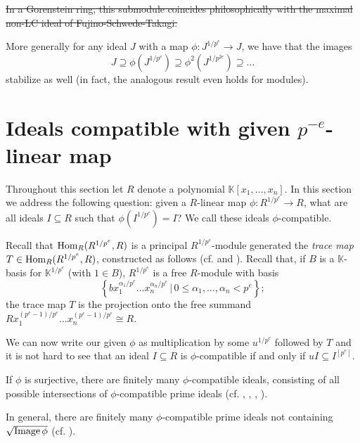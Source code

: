 \documentclass[11pt]{amsart}
\begin{document}
\bigskip\sout{In a Gorenstein ring, this submodule coincides philosophically with the maximal non-LC ideal of Fujino-Schwede-Takagi.}

More generally for any ideal $J$ with a map $\phi : J^{1/p^e} \to J$, we have that the images
\[
J \supseteq \phi(J^{1/p^e}) \supseteq \phi^2(J^{1/p^{2e}}) \supseteq \dots
\]
stabilize as well (in fact, the analogous result even holds for modules).


\section{Ideals compatible with given $p^{-e}$-linear map}\label{Section: compatible ideals}

Throughout this section let $R$ denote a polynomial $\mathbb{K}[x_1, \dots, x_n]$. In this section we address the following question:
given a $R$-linear map $\phi: R^{1/p^e} \rightarrow R$, what are all ideals $I\subseteq R$ such that $\phi(I^{1/p^e})=I$?
We call these ideals $\phi$-compatible.

Recall that  $\operatorname{Hom}_R( R^{1/p^e}, R)$  is a principal $R^{1/p^e}$-module generated
the \emph{trace map} $T\in \operatorname{Hom}_R(R^{1/p^e}, R)$, constructed as follows (cf. \cite[Lemma 1.6]{FedderFPureRat} and \cite[Example 1.3.1]{BrionKumarFrobeniusSplitting}).
Recall that, if $B$ is a $\mathbb{K}$-basis for $\mathbb{K}^{1/p^e}$ (with $1\in B$),
$R^{1/p^e}$ is a free $R$-module with basis
$$\left\{ b x_1^{\alpha_1/p^e} \dots x_n^{\alpha_n/p^e} \,|\, 0\leq \alpha_1, \dots, \alpha_n < p^e \right\} ;$$
the trace map $T$ is the projection onto the free summand
$R x_1^{(p^e-1)/p^e} \dots x_n^{(p^e-1)/p^e}\cong R$.

We can now write our given $\phi$ as multiplication by some $u^{1/p^e}$ followed by $T$ and it is not hard to see that
an ideal $I\subseteq R$ is $\phi$-compatible if and only if $u I \subseteq I^{[p^e]}$.

\begin{theorem}\label{Theorem: finitely many compatible primes}
If $\phi$ is surjective, there are finitely many $\phi$-compatible ideals, consisting of all possible intersections
of $\phi$-compatible prime ideals (cf. \cite{KumarMehtaFiniteness}, \cite{SchwedeFAdjunction},
\cite{SharpGradedAnnihilatorsOfModulesOverTheFrobeniusSkewPolynomialRing}, \cite{EnescuHochsterTheFrobeniusStructureOfLocalCohomology}).

In general, there are finitely many $\phi$-compatible prime ideals not containing $\sqrt{\operatorname{Image} \phi}$ (cf. \cite{KatzmanSchwedeAlgorithm}).

\end{theorem}
\end{document}
